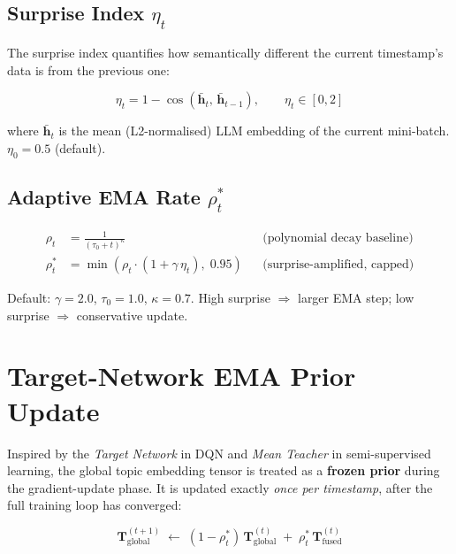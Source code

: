 \documentclass[11pt,a4paper]{article}
\begin{document}
\subsection{Surprise Index $\eta_t$}

The surprise index quantifies how semantically different the current timestamp's
data is from the previous one:

\begin{equation}
  \eta_t = 1 - \cos\!\left(\bar{\mathbf{h}}_t,\, \bar{\mathbf{h}}_{t-1}\right),
  \qquad \eta_t \in [0, 2]
  \label{eq:surprise}
\end{equation}

where $\bar{\mathbf{h}}_t$ is the mean (L2-normalised) LLM embedding of the
current mini-batch. $\eta_0 = 0.5$ (default).

\subsection{Adaptive EMA Rate $\rho_t^*$}

\begin{align}
  \rho_t &= \frac{1}{(\tau_0 + t)^\kappa} & &\text{(polynomial decay baseline)} \\
  \rho_t^* &= \min\!\left(\rho_t \cdot (1 + \gamma\,\eta_t),\; 0.95\right)
              & &\text{(surprise-amplified, capped)} \label{eq:rho_star}
\end{align}

Default: $\gamma=2.0$, $\tau_0=1.0$, $\kappa=0.7$.
High surprise $\Rightarrow$ larger EMA step; low surprise $\Rightarrow$ conservative update.

\section{Target-Network EMA Prior Update}

Inspired by the \emph{Target Network} in DQN and \emph{Mean Teacher} in
semi-supervised learning, the global topic embedding tensor is treated as a
\textbf{frozen prior} during the gradient-update phase. It is updated exactly
\emph{once per timestamp}, after the full training loop has converged:

\begin{equation}
  \boxed{
    \mathbf{T}_\text{global}^{(t+1)}
    \;\leftarrow\;
    (1 - \rho_t^*)\,\mathbf{T}_\text{global}^{(t)}
    \;+\;
    \rho_t^*\,\mathbf{T}_\text{fused}^{(t)}
  }
  \label{eq:ema}
\end{equation}
\end{document}
